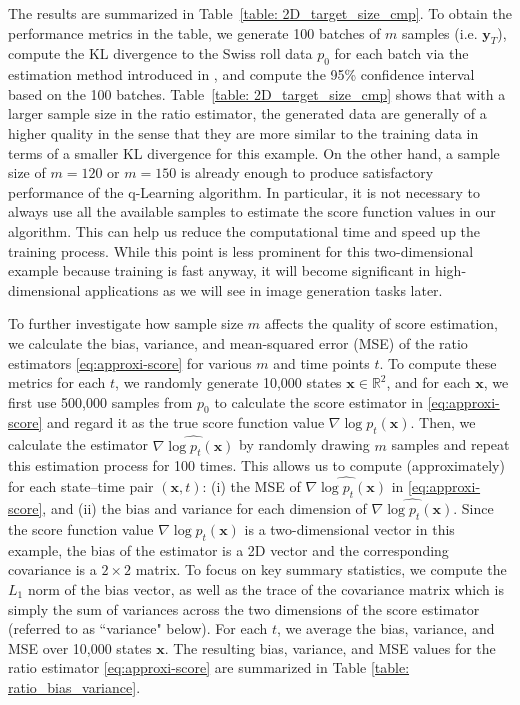 \documentclass[11pt]{article}
\begin{document}
 The results are summarized in Table~\ref{table: 2D_target_size_cmp}.
 To obtain the performance metrics in the table, we generate 100 batches of $m$ samples (i.e. $\mathbf{y}_T$), compute the KL divergence to the Swiss roll data $p_0$ for each batch via the estimation method introduced in \cite{wang2009divergence}, and compute the 95\% confidence interval based on the 100 batches.
 Table~\ref{table: 2D_target_size_cmp} shows  that with a larger sample size in the ratio estimator, the generated data are generally of a higher quality in the sense that they are more similar to the training data in terms of a smaller KL divergence for this example. On the other hand, a sample size of $m=120$ or $m=150$ is already enough to produce satisfactory performance of the q-Learning algorithm. In particular, it is not necessary to always use all the available samples to estimate the score function values in our algorithm. This can help us reduce the computational time and speed up the training process. While this point is less prominent  for this two-dimensional example because training is fast anyway, it will become significant in high-dimensional applications as  we will see in image generation tasks later.


To further investigate how sample size $m$ affects the quality of score estimation, we calculate the bias, variance, and mean-squared error (MSE) of the ratio estimators \eqref{eq:approxi-score} for various $m$ and time points $t$. To compute these metrics for each $t$, we randomly generate 10,000 states $\mathbf{x}\in\mathbb{R}^2$, and for each $\mathbf{x}$, we first use 500,000 samples from $p_0$ to calculate the score estimator in \eqref{eq:approxi-score} and regard it as the true score function value $\nabla\log p_{t}(\mathbf{x})$. Then, we calculate the estimator $\widehat{ \nabla\log p_{t}(\mathbf{x}) }$  by randomly drawing $m$ samples and repeat this estimation process for 100 times. This allows us to compute (approximately) for each state--time pair $(\mathbf{x}, t)$: (i) the MSE of $\widehat{ \nabla\log p_{t}(\mathbf{x}) }$ in \eqref{eq:approxi-score}, and (ii) the bias and variance for each dimension of $\widehat{ \nabla\log p_{t}(\mathbf{x}) }$.
Since the score function value $\nabla\log p_{t}(\mathbf{x})$ is a two-dimensional vector in this example, the bias of the estimator is a 2D vector and the corresponding covariance is a $2\times2$ matrix. To focus on key summary statistics, we compute the $L_1$ norm of the bias vector, as well as the  trace of the covariance matrix which is simply the sum of variances across the two dimensions of the score estimator (referred to as ``variance" below). For each $t$, we average the bias,  variance, and MSE over 10,000 states $\mathbf{x}$. The resulting bias, variance, and MSE values for the ratio estimator \eqref{eq:approxi-score} are summarized in Table \ref{table: ratio_bias_variance}.
\end{document}
